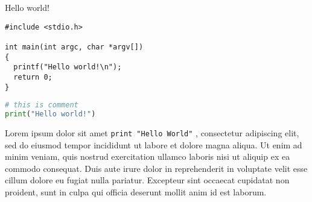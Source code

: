 \documentclass[a4paper]{article}
\begin{document}
Hello world!

\begin{verbatim}
#include <stdio.h>

int main(int argc, char *argv[])
{
  printf("Hello world!\n");
  return 0;
}
\end{verbatim}

\begin{lstlisting}[language=Python]
# this is comment
print("Hello world!")
\end{lstlisting}



Lorem ipsum dolor sit amet \lstinline{print "Hello World"} , consectetur adipiscing elit, sed do eiusmod tempor incididunt ut labore et dolore magna aliqua. Ut enim ad minim veniam, quis nostrud exercitation ullamco laboris nisi ut aliquip ex ea commodo consequat. Duis aute irure dolor in reprehenderit in voluptate velit esse cillum dolore eu fugiat nulla pariatur. Excepteur sint occaecat cupidatat non proident, sunt in culpa qui officia deserunt mollit anim id est laborum.
\end{document}
